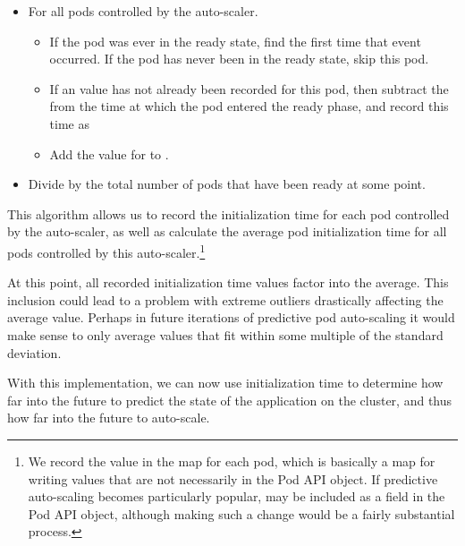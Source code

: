\begin{itemize}
  \item For all pods controlled by the auto-scaler.
    \begin{itemize}
      \item If the pod was ever in the ready state, find the first time that
        event occurred. If the pod has never been in the ready state, skip this pod.
      \item If an  value has not already been recorded for
        this pod, then subtract the  from the time at which the
        pod entered the ready phase, and record this time as
      \item Add the value for  to
        .
      \end{itemize}
    \item Divide  by the total number of pods that
      have been ready at some point.
\end{itemize}

This algorithm allows us to record the initialization time for each pod
controlled by the auto-scaler, as well as calculate the average pod
initialization time for all pods controlled by this auto-scaler.\footnote{We
record the value in the  map for each pod,
which is basically a map for writing
values that are not necessarily in the Pod API object. If predictive
auto-scaling becomes particularly popular,  may be
included as a field in the Pod API object, although making such a change would
be a fairly substantial process.}

At this point, all recorded initialization time values factor into the average.
This inclusion could lead to a problem with extreme outliers drastically
affecting the average value. Perhaps in future iterations of predictive pod
auto-scaling it would make sense to only average values that fit within some
multiple of the standard deviation.

With this implementation, we can now use initialization time to determine how
far into the future to predict the state of the application on the cluster, and
thus how far into the future to auto-scale.
